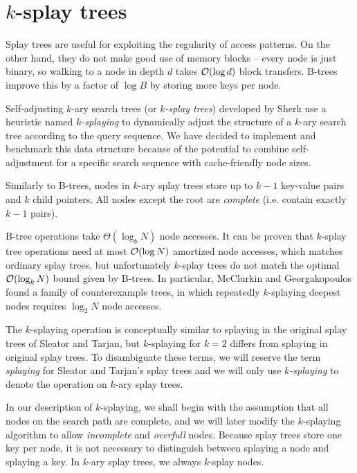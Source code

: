 \chapter{$k$-splay trees}
Splay trees are useful for exploiting the regularity of access patterns.
On the other hand, they do not make good use of memory blocks -- every node
is just binary, so walking to a node in depth $d$ takes $\mathcal{O}(\log d)$ block
transfers. B-trees improve this by a factor of $\log B$ by storing more keys
per node.

Self-adjusting $k$-ary search trees (or \textit{$k$-splay trees}) developed
by Sherk\cite{ksplay-sherk} use a heuristic named \textit{$k$-splaying}
to dynamically adjust the structure of a $k$-ary search tree according to
the query sequence. We have decided to implement and benchmark this data
structure because of the potential to combine self-adjustment for a specific
search sequence with cache-friendly node sizes.

Similarly to B-trees, nodes in $k$-ary splay trees store up to $k-1$ key-value
pairs and $k$ child pointers. All nodes except the root are \textit{complete}
(i.e. contain exactly $k-1$ pairs).

B-tree operations take $\Theta(\log_b N)$ node accesses. It can be proven that
$k$-splay tree operations need at most $\mathcal{O}(\log N)$ amortized node accesses,
which matches ordinary splay trees, but unfortunately $k$-splay trees
do not match the optimal $\mathcal{O}(\log_k N)$ bound given by B-trees. In particular,
McClurkin and Georgakopoulos\cite{ksplay-nonopt} found a family
of counterexample trees, in which repeatedly $k$-splaying deepest nodes
requires $\log_2 N$ node accesses.

The $k$-splaying operation is conceptually similar to splaying in the original
splay trees of Sleator and Tarjan, but $k$-splaying for $k=2$ differs from
splaying in original splay trees. To disambiguate these terms, we will
reserve the term \textit{splaying} for Sleator and Tarjan's splay trees and
we will only use \textit{$k$-splaying} to denote the operation
on $k$-ary splay trees.

In our description of $k$-splaying, we shall begin with the assumption that
all nodes on the search path are complete, and we will later modify
the $k$-splaying algorithm to allow \textit{incomplete} and \textit{overfull}
nodes.
Because splay trees store one key per node, it is not necessary to distinguish
between splaying a node and splaying a key. In $k$-ary splay trees, we always
$k$-splay nodes.

